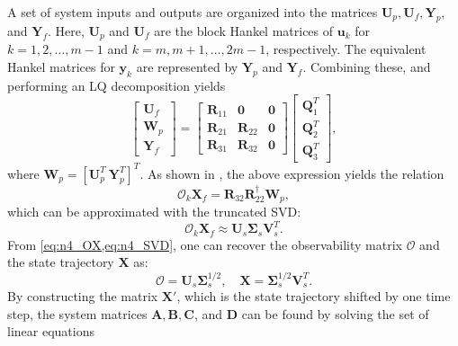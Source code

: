\documentclass[../main.tex]{subfiles}
\begin{document}
A set of system inputs and outputs are organized into the matrices $\bm{U}_p, \bm{U}_f, \bm{Y}_p$, and $\bm{Y}_f$. Here,
$\bm{U}_p$ and $\bm{U}_f$ are the block Hankel matrices of $\bm{u}_k$ for  $k = 1,2, \ldots ,m-1$ and $ k = m,m+1, \ldots ,2 m - 1$, respectively. The equivalent Hankel matrices for $\bm{y}_k$ are represented by $\bm{Y}_p$ and $\bm{Y}_f$. Combining these, and performing an LQ decomposition yields
\begin{equation}
    \begin{bmatrix}
        \bm{U}_f \\ \bm{W}_p \\ \bm{Y}_f
    \end{bmatrix}
    =
    \begin{bmatrix}
        \bm{R}_{11} & \bm{0} & \bm{0} \\
        \bm{R}_{21} & \bm{R}_{22} & \bm{0} \\
        \bm{R}_{31} & \bm{R}_{32} & \bm{0}
    \end{bmatrix}
    \begin{bmatrix}
        \bm{Q}_1^T \\ \bm{Q}_2^T \\ \bm{Q}_3^T
    \end{bmatrix},
\end{equation}
where $\bm{W}_p = \left[ \bm{U}_p^T\ \bm{Y}_p ^T\right]^T$. As shown in \cite{vanoverschee1994}, the above expression yields the relation
\begin{equation}
\label{eq:n4_OX}
    \bm{\mathcal{O}}_k \bm{X}_f = \bm{R}_{32} \bm{R}_{22}^{\dagger} \bm{W}_p,
\end{equation}
which can be approximated with the truncated SVD:
\begin{equation}
\label{eq:n4_SVD}
    \bm{\mathcal{O}}_k \bm{X}_f \approx \bm{U}_s \bm{\Sigma}_s \bm{V}^T_s.
\end{equation}
From \cref{eq:n4_OX,eq:n4_SVD}, one can recover the observability matrix $\bm{\mathcal{O}}$ and the state trajectory $\bm{X}$ as:
\begin{equation}
\bm{\mathcal{O}} = \bm{U}_s \bm{\Sigma}_s^{1/2}, \quad \bm{X} = \bm{\Sigma}_s^{1/2} \bm{V}_s^T.
\end{equation}
By constructing the matrix $\bm{X}'$, which is the state trajectory shifted by one time step, the system matrices $\bm{A}, \bm{B}, \bm{C}$, and $\bm{D}$ can be found by solving the set of linear equations
\end{document}
